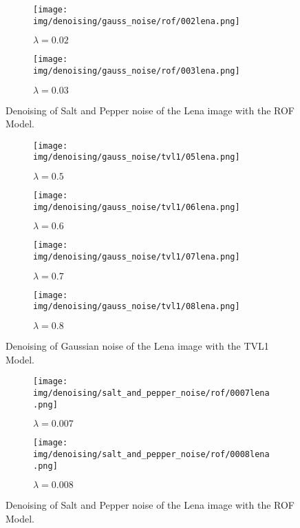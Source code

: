 \begin{figure}[ht]
    \centering
    \begin{subfigure}[b]{0.45\textwidth}
        \texttt{[image: img/denoising/gauss\_noise/rof/002lena.png]}
        \caption{$\lambda = 0.02$}
    \end{subfigure}
    \begin{subfigure}[b]{0.45\textwidth}
        \texttt{[image: img/denoising/gauss\_noise/rof/003lena.png]}
        \caption{$\lambda = 0.03$}
    \end{subfigure}
    \caption{Denoising of Salt and Pepper noise of the Lena image with the ROF Model.}
\label{fig:denoising_lena_rof_gauss}
\end{figure}

\begin{figure}[ht]
    \centering
    \begin{subfigure}[b]{0.45\textwidth}
        \texttt{[image: img/denoising/gauss\_noise/tvl1/05lena.png]}
        \caption{$\lambda = 0.5$}
    \end{subfigure}
    \begin{subfigure}[b]{0.45\textwidth}
        \texttt{[image: img/denoising/gauss\_noise/tvl1/06lena.png]}
        \caption{$\lambda = 0.6$}
    \end{subfigure}
    \begin{subfigure}[b]{0.45\textwidth}
        \texttt{[image: img/denoising/gauss\_noise/tvl1/07lena.png]}
        \caption{$\lambda = 0.7$}
    \end{subfigure}
    \begin{subfigure}[b]{0.45\textwidth}
        \texttt{[image: img/denoising/gauss\_noise/tvl1/08lena.png]}
        \caption{$\lambda = 0.8$}
    \end{subfigure}
    \caption{Denoising of Gaussian noise of the Lena image with the TVL1 Model.}
\label{fig:denoising_lena_tvl1_gauss}
\end{figure}

\begin{figure}[ht]
    \centering
    \begin{subfigure}[b]{0.45\textwidth}
        \texttt{[image: img/denoising/salt\_and\_pepper\_noise/rof/0007lena.png]}
        \caption{$\lambda = 0.007$}
    \end{subfigure}
    \begin{subfigure}[b]{0.45\textwidth}
        \texttt{[image: img/denoising/salt\_and\_pepper\_noise/rof/0008lena.png]}
        \caption{$\lambda = 0.008$}
    \end{subfigure}
    \caption{Denoising of Salt and Pepper noise of the Lena image with the ROF Model.}
\label{fig:denoising_lena_rof_sap}
\end{figure}

